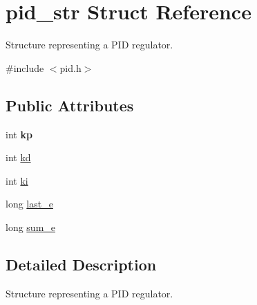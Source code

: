 \hypertarget{structpid__str}{
\section{pid\_\-str Struct Reference}
\label{structpid__str}
}


Structure representing a PID regulator.  




{\ttfamily \#include $<$pid.h$>$}

\subsection*{Public Attributes}
\begin{DoxyCompactItemize}
\item 
\hypertarget{structpid__str_a7c039d6ba7d0cc9d03fe3631f5ee5811}{
int {\bfseries kp}}
\label{structpid__str_a7c039d6ba7d0cc9d03fe3631f5ee5811}

\item 
int \hyperlink{structpid__str_a0f9566f4e143fbbf1a8c4f3ab920f7cb}{kd}
\item 
int \hyperlink{structpid__str_a1246caf4496665d0d9122ae001e9bbea}{ki}
\item 
long \hyperlink{structpid__str_afba88804d3ae4faf2c06e0199d553745}{last\_\-e}
\item 
long \hyperlink{structpid__str_ab5da6edeb8d607bf45f9be8330079120}{sum\_\-e}
\end{DoxyCompactItemize}


\subsection{Detailed Description}
Structure representing a PID regulator. 


